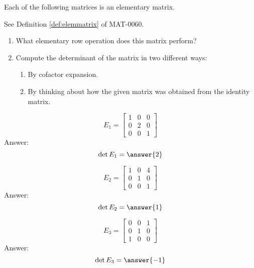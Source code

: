 \documentclass{ximera}
\begin{document}
\begin{problem}
Each of the following matrices is an elementary matrix. 
\begin{hint}
See Definition \ref{def:elemmatrix} of MAT-0060.
\end{hint}
  \begin{enumerate}
  \item What elementary row operation does this matrix perform?
  \item Compute the determinant of the matrix in two different ways:
    \begin{enumerate}
    \item By cofactor expansion.
    \item By thinking about how the given matrix was obtained from the identity matrix.
    \end{enumerate}
  \end{enumerate}
  
  \begin{problem}\label{prob:elemmatdet1}
  $$E_1=\begin{bmatrix}1&0&0\\0&2&0\\0&0&1\end{bmatrix}$$
   Answer: $$\det{E_1}=\answer{2}$$
  \end{problem}
  
  \begin{problem}\label{prob:elemmatdet2}
  $$E_2=\begin{bmatrix}1&0&4\\0&1&0\\0&0&1\end{bmatrix}$$
   Answer: $$\det{E_2}=\answer{1}$$
  \end{problem}
  
  \begin{problem}\label{prob:elemmatdet3}
  $$E_3=\begin{bmatrix}0&0&1\\0&1&0\\1&0&0\end{bmatrix}$$
   Answer: $$\det{E_3}=\answer{-1}$$
  \end{problem}
  
\end{problem}
\end{document}
